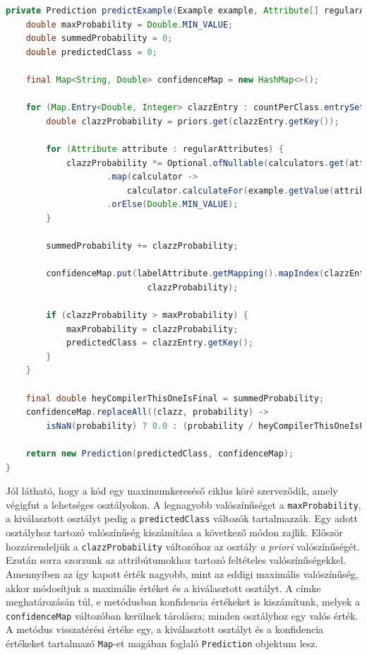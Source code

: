 \documentclass[a4paper]{article}
\begin{document}
\begin{lstlisting}[language=Java, caption={Rekord osztályozása.}, captionpos=b, escapechar=$]
private Prediction predictExample(Example example, Attribute[] regularAttributes) {
    double maxProbability = Double.MIN_VALUE;
    double summedProbability = 0;
    double predictedClass = 0;

    final Map<String, Double> confidenceMap = new HashMap<>();

    for (Map.Entry<Double, Integer> clazzEntry : countPerClass.entrySet()) {
        double clazzProbability = priors.get(clazzEntry.getKey());

        for (Attribute attribute : regularAttributes) {
            clazzProbability *= Optional.ofNullable(calculators.get(attribute.getName()))
                    .map(calculator ->
                        calculator.calculateFor(example.getValue(attribute), clazzEntry.getKey()))
                    .orElse(Double.MIN_VALUE);
        }

        summedProbability += clazzProbability;

        confidenceMap.put(labelAttribute.getMapping().mapIndex(clazzEntry.getKey().intValue()), 
                            clazzProbability);

        if (clazzProbability > maxProbability) {
            maxProbability = clazzProbability;
            predictedClass = clazzEntry.getKey();
        }
    }

    final double heyCompilerThisOneIsFinal = summedProbability;
    confidenceMap.replaceAll((clazz, probability) ->
        isNaN(probability) ? 0.0 : (probability / heyCompilerThisOneIsFinal));

    return new Prediction(predictedClass, confidenceMap);
}
\end{lstlisting}

Jól látható, hogy a kód egy maximumkereséső ciklus köré szerveződik, amely végigfut a lehetséges osztályokon. A legnagyobb valószínűséget a \texttt{maxProbability}, a kiválasztott osztályt pedig a \texttt{predictedClass} változók tartalmazzák. Egy adott osztályhoz tartozó valószínűség kiszámítása a következő módon zajlik. Először hozzárendeljük a \texttt{clazzProbability} változóhoz az osztály \textit{a priori} valószínűségét. Ezután sorra szorzunk az attribútumokhoz tartozó feltételes valószínűségekkel. Amennyiben az így kapott érték nagyobb, mint az eddigi maximális valószínűség, akkor módosítjuk a maximális értéket és a kiválasztott osztályt.
A címke meghatározásán túl, e metódusban konfidencia értékeket is kiszámítunk, melyek a \texttt{confidenceMap} változóban kerülnek tárolásra; minden osztályhoz egy valós érték. 
A metódus visszatérési értéke egy, a kiválasztott osztályt és a konfidencia értékeket tartalmazó \texttt{Map}-et magában foglaló \texttt{Prediction} objektum lesz.
\end{document}
